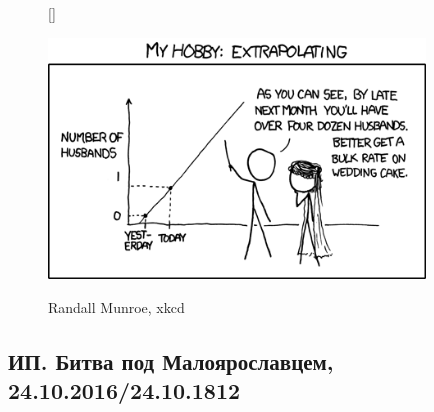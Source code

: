 \documentclass[12pt, a4paper]{article}\usepackage[]{graphicx}\usepackage[]{color}
\begin{document}
\begin{figure}[h!]
[\FBwidth]
{\caption*{Randall Munroe, xkcd}}
{\includegraphics[width=10cm]{figures/extrapolating.png}}
\end{figure}

\subsection{ИП. Битва под Малоярославцем, 24.10.2016/24.10.1812}
\end{document}
